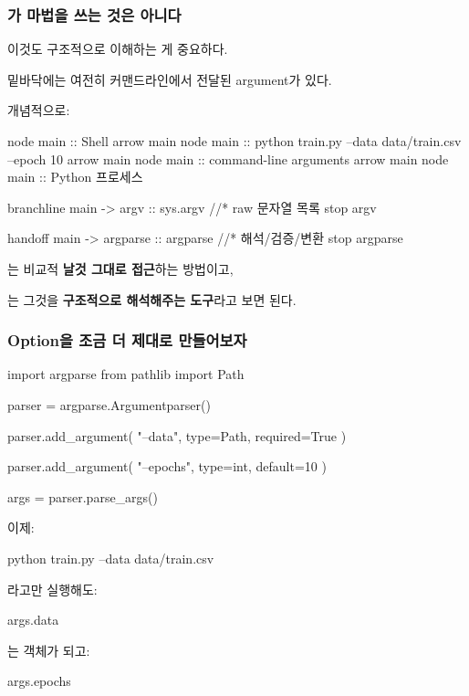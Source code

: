 \subsubsection{가 마법을 쓰는 것은 아니다}

이것도 구조적으로 이해하는 게 중요하다.

밑바닥에는 여전히 커맨드라인에서 전달된 argument가 있다.

개념적으로:

\begin{dhkbranch}[in=4]
node main :: Shell
arrow main
node main :: python train.py --data data/train.csv --epoch 10
arrow main
node main :: command-line arguments
arrow main
node main :: Python 프로세스

branchline main -> argv :: sys.argv //* raw 문자열 목록
stop argv

handoff main -> argparse :: argparse //* 해석/검증/변환
stop argparse
\end{dhkbranch}

는 비교적 \textbf{날것 그대로 접근}하는 방법이고,

는 그것을 \textbf{구조적으로 해석해주는 도구}라고 보면 된다.

\subsubsection{Option을 조금 더 제대로 만들어보자}

\begin{dhkcode}
import argparse
from pathlib import Path

parser = argparse.Argumentparser()

parser.add_argument(
    "--data",
    type=Path,
    required=True
)

parser.add_argument(
    "--epochs",
    type=int,
    default=10
)

args = parser.parse_args()
\end{dhkcode}

이제:

\begin{dhkzsh}
python train.py --data data/train.csv
\end{dhkzsh}

라고만 실행해도:

\begin{dhkcode}
args.data
\end{dhkcode}

는 객체가 되고:

\begin{dhkcode}
args.epochs
\end{dhkcode}

